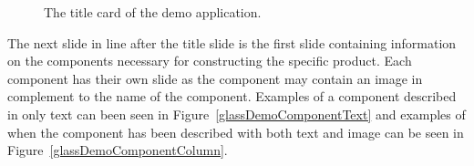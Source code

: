 	
	\begin{figure}[ht!]
		\centering
   		 \qquad
   		 \qquad
		\caption{The title card of the demo application.}
		\label{glassDemoTitleCard}
	\end{figure}
	
The next slide in line after the title slide is the first slide containing information on the components necessary for constructing the specific product. Each component has their own slide as the component may contain an image in complement to the name of the component. Examples of a component described in only text can been seen in Figure~\ref{glassDemoComponentText} and examples of when the component has been described with both text and image can be seen in Figure~\ref{glassDemoComponentColumn}.

